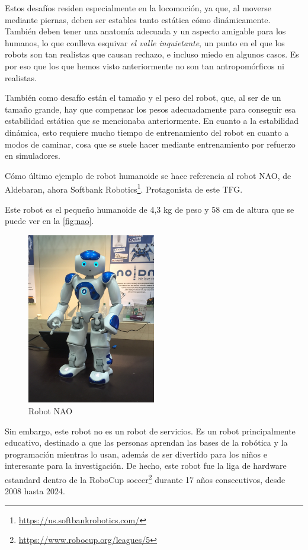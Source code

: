 Estos desafíos residen especialmente en la locomoción, ya que, al moverse mediante piernas, deben ser estables tanto estática cómo dinámicamente. También deben tener una anatomía adecuada y un aspecto amigable para los humanos, lo que conlleva esquivar \textit{el valle inquietante}, un punto en el que los robots son tan realistas que causan rechazo, e incluso miedo en algunos casos. Es por eso que los que hemos visto anteriormente no son tan antropomórficos ni realistas. 

También como desafío están el tamaño y el peso del robot, que, al ser de un tamaño grande, hay que compensar los pesos adecuadamente para conseguir esa estabilidad estática que se mencionaba anteriormente. En cuanto a la estabilidad dinámica, esto requiere mucho tiempo de entrenamiento del robot en cuanto a modos de caminar, cosa que se suele hacer mediante entrenamiento por refuerzo en simuladores.

Cómo último ejemplo de robot humanoide se hace referencia al robot NAO\cite{pagina_nao}, de Aldebaran, ahora Softbank Robotics\footnote{\url{https://us.softbankrobotics.com/}}. Protagonista de este TFG.

Este robot es el pequeño humanoide de 4,3 kg de peso y 58 cm de altura que se puede ver en la \autoref{fig:nao}.

\begin{figure}[H]
    \centering
    \includegraphics[width=0.5\textwidth]{figures/cap_1/nao.jpg}
    \caption{Robot NAO}
    \label{fig:nao}
\end{figure}

Sin embargo, este robot no es un robot de servicios. Es un robot principalmente educativo, destinado a que las personas aprendan las bases de la robótica y la programación mientras lo usan, además de ser divertido para los niños e interesante para la investigación. De hecho, este robot fue la liga de hardware estandard dentro de la RoboCup soccer\footnote{\url{https://www.robocup.org/leagues/5}} durante 17 años consecutivos, desde 2008 hasta 2024.

